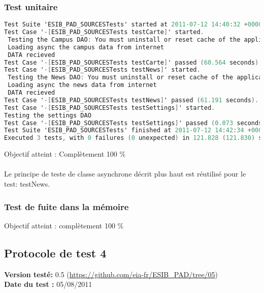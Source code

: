 		 		 \subsubsection*{Test unitaire}
		 		 \begin{lstlisting}[language=C,caption = Log des test unitaires]
Test Suite 'ESIB_PAD_SOURCESTests' started at 2011-07-12 14:40:32 +0000
Test Case '-[ESIB_PAD_SOURCESTests testCarte]' started.
 Testing the Campus DAO: You must uninstall or reset cache of the application before testing
 Loading async the campus data from internet
 DATA recieved
Test Case '-[ESIB_PAD_SOURCESTests testCarte]' passed (60.564 seconds).
Test Case '-[ESIB_PAD_SOURCESTests testNews]' started.
 Testing the News DAO: You must uninstall or reset cache of the application before testing
 Loading async the news data from internet
 DATA recieved
Test Case '-[ESIB_PAD_SOURCESTests testNews]' passed (61.191 seconds).
Test Case '-[ESIB_PAD_SOURCESTests testSettings]' started.
Testing the settings DAO
Test Case '-[ESIB_PAD_SOURCESTests testSettings]' passed (0.073 seconds).
Test Suite 'ESIB_PAD_SOURCESTests' finished at 2011-07-12 14:42:34 +0000.
Executed 3 tests, with 0 failures (0 unexpected) in 121.828 (121.830) seconds
		 		 \end{lstlisting}
		 		Objectif atteint : {\color{green}Complètement 100 \% \CheckedBox}\\
		 		\\
		 		Le principe de teste de classe asynchrone décrit plus haut est réutilisé pour le test: testNews.
		 		 \subsubsection*{Test de fuite dans la mémoire}
		 		 Objectif atteint : {\color{green}complètement 100 \% \CheckedBox}\\
	
	
	
		\subsection{Protocole de test 4}
		 		\textbf{Version testé:} 0.5 (\url{https://github.com/eia-fr/ESIB_PAD/tree/05}) \\
		 		\textbf{	Date du test :} 05/08/2011
		 

